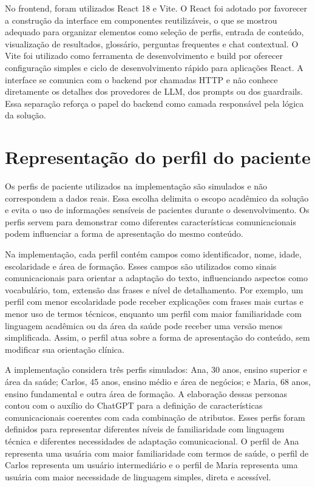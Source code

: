 No frontend, foram utilizados React 18 e Vite. O React foi adotado por favorecer a construção da interface em componentes reutilizáveis, o que se mostrou adequado para organizar elementos como seleção de perfis, entrada de conteúdo, visualização de resultados, glossário, perguntas frequentes e chat contextual. O Vite foi utilizado como ferramenta de desenvolvimento e build por oferecer configuração simples e ciclo de desenvolvimento rápido para aplicações React. A interface se comunica com o backend por chamadas HTTP e não conhece diretamente os detalhes dos provedores de LLM, dos prompts ou dos guardrails. Essa separação reforça o papel do backend como camada responsável pela lógica da solução.

\section{Representação do perfil do paciente}
\label{sec:representacao-perfil-paciente}

Os perfis de paciente utilizados na implementação são simulados e não correspondem a dados reais. Essa escolha delimita o escopo acadêmico da solução e evita o uso de informações sensíveis de pacientes durante o desenvolvimento. Os perfis servem para demonstrar como diferentes características comunicacionais podem influenciar a forma de apresentação do mesmo conteúdo.

Na implementação, cada perfil contém campos como identificador, nome, idade, escolaridade e área de formação. Esses campos são utilizados como sinais comunicacionais para orientar a adaptação do texto, influenciando aspectos como vocabulário, tom, extensão das frases e nível de detalhamento. Por exemplo, um perfil com menor escolaridade pode receber explicações com frases mais curtas e menor uso de termos técnicos, enquanto um perfil com maior familiaridade com linguagem acadêmica ou da área da saúde pode receber uma versão menos simplificada. Assim, o perfil atua sobre a forma de apresentação do conteúdo, sem modificar sua orientação clínica.

A implementação considera três perfis simulados: Ana, 30 anos, ensino superior e área da saúde; Carlos, 45 anos, ensino médio e área de negócios; e Maria, 68 anos, ensino fundamental e outra área de formação. A elaboração dessas personas contou com o auxílio do ChatGPT para a definição de características comunicacionais coerentes com cada combinação de atributos. Esses perfis foram definidos para representar diferentes níveis de familiaridade com linguagem técnica e diferentes necessidades de adaptação comunicacional. O perfil de Ana representa uma usuária com maior familiaridade com termos de saúde, o perfil de Carlos representa um usuário intermediário e o perfil de Maria representa uma usuária com maior necessidade de linguagem simples, direta e acessível.

